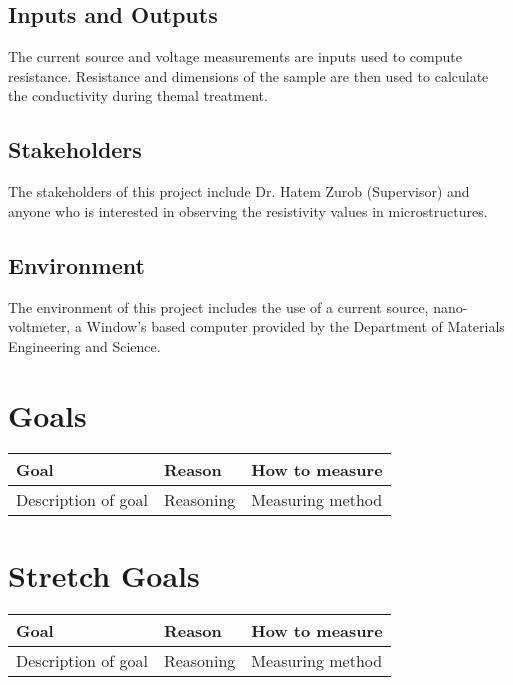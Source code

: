 \documentclass{article}
\begin{document}
\subsection{Inputs and Outputs}
The current source and voltage measurements are inputs used to compute resistance.
Resistance and dimensions of the sample are then used to calculate the conductivity 
during themal treatment.


\subsection{Stakeholders}
The stakeholders of this project include Dr. Hatem Zurob (Supervisor) and 
anyone who is interested in observing the resistivity values in microstructures.

\subsection{Environment}
The environment of this project includes the use of a current source, nano-voltmeter,
a Window's based computer provided by the Department of Materials Engineering and Science.

\section{Goals}



\begin{tabular}{ |p{3cm}||p{3cm}|p{4cm}|}
    \hline
    Goal& Reason & How to measure\\
    \hline
   Description of goal & Reasoning & Measuring method \\
    \hline
   \end{tabular}

\section{Stretch Goals}

\begin{tabular}{ |p{3cm}||p{3cm}|p{4cm}|}
    \hline
    Goal& Reason & How to measure\\
    \hline
   Description of goal & Reasoning & Measuring method \\
    \hline
   \end{tabular}
\end{document}

